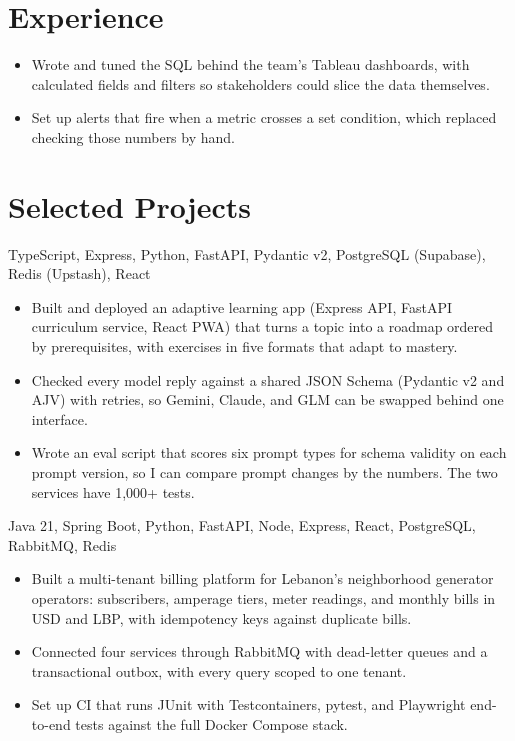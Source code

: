 \documentclass[10pt, a4paper]{article}
\begin{document}
\section{Experience}

\begin{itemize}
  \item Wrote and tuned the SQL behind the team's Tableau dashboards, with
        calculated fields and filters so stakeholders could slice the data
        themselves.
  \item Set up alerts that fire when a metric crosses a set condition, which
        replaced checking those numbers by hand.
\end{itemize}

\section{Selected Projects}

%
  {TypeScript, Express, Python, FastAPI, Pydantic v2, PostgreSQL (Supabase), Redis (Upstash), React}
\begin{itemize}
  \item Built and deployed an adaptive learning app (Express API, FastAPI
        curriculum service, React PWA) that turns a topic into a roadmap ordered
        by prerequisites, with exercises in five formats that adapt to mastery.
  \item Checked every model reply against a shared JSON Schema (Pydantic v2
        and AJV) with retries, so Gemini, Claude, and GLM can be swapped
        behind one interface.
  \item Wrote an eval script that scores six prompt types for schema validity
        on each prompt version, so I can compare prompt changes by the numbers.
        The two services have 1{,}000+ tests.
\end{itemize}

\vspace{3pt}

%
  {Java 21, Spring Boot, Python, FastAPI, Node, Express, React, PostgreSQL, RabbitMQ, Redis}
\begin{itemize}
  \item Built a multi-tenant billing platform for Lebanon's neighborhood
        generator operators: subscribers, amperage tiers, meter readings, and
        monthly bills in USD and LBP, with idempotency keys against duplicate bills.
  \item Connected four services through RabbitMQ with dead-letter queues and a
        transactional outbox, with every query scoped to one tenant.
  \item Set up CI that runs JUnit with Testcontainers, pytest, and Playwright
        end-to-end tests against the full Docker Compose stack.
\end{itemize}
\end{document}
